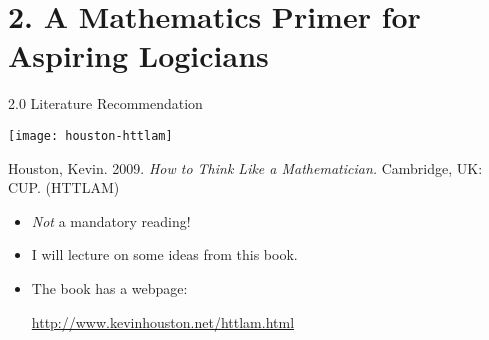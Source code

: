 \documentclass[../slides.tex]{subfiles}
\begin{document}
\section{2. A Mathematics Primer for Aspiring Logicians}
\begin{frame}{2.0 Literature Recommendation}

	\begin{center}
		\texttt{[image: houston-httlam]}
	\end{center}

Houston, Kevin. 2009. \emph{How to Think Like a Mathematician.} Cambridge, UK: CUP. (HTTLAM)

\begin{itemize}

	\item \emph{Not} a mandatory reading!
	
	\item I will lecture on some ideas from this book.

	\item The book has a webpage:

	\begin{center}
	\url{http://www.kevinhouston.net/httlam.html}
	\end{center}
	
\end{itemize}

\end{frame}
\end{document}
